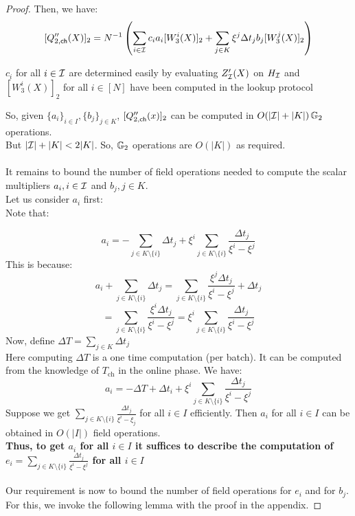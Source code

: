 \begin{proof}
    Then, we have:
    \begin{equation}\label{eq:Qcachepoly2commit}
    [Q''_{2,\mathsf{ch}}({X})]_2 = N^{-1}\left(\sum_{i\in\mathcal{I}}c_ia_i[W_3^i(X)]_2 + \sum_{j\in K}\xi^j \Delta t_j b_j [W_3^j(X)]_2\right)
    \end{equation}

    $c_i$ for all $i \in \mathcal{I}$ are determined easily by evaluating $Z_{\mathcal{I}}'(X)$ on $H_{\mathcal{I}}$ and $[W_3^i(X)]_2$ for all $i \in [N]$ have been computed in the lookup protocol

    So, given $\{a_i\}_{i\in I}, \{b_j\}_{j\in K}$, $[Q''_{2,\mathsf{ch}}({x})]_2$ can be computed in $O(|\mathcal{I}|+|K|)\, \mathbb{G}_2$ operations.\\
    But $|\mathcal{I}|+|K|<2|K|$. So, $\mathbb{G}_2$ operations are $O(|K|)$ as required.\\\\

    It remains to bound the number of field operations needed to compute the scalar multipliers $a_i, i \in \mathcal{I}$ and $b_j, j \in K$. \\

    Let us consider $a_i$ first:\\
    Note that:

    $$ a_i = -\sum_{j\in K\setminus \{i\}}\Delta t_j + \xi^i\sum_{j\in K\setminus \{i\}}\frac{\Delta t_j}{\xi^i-\xi^j} $$
    This is because:
    $$a_i+\sum_{j\in K\setminus \{i\}}\Delta t_j= \sum_{j \in K \setminus \{i\}}\frac{\xi^j\Delta t_j}{\xi^i-\xi^j}+\Delta t_j$$
    $$=\sum_{j \in K \setminus \{i\}}\frac{\xi^i\Delta t_j}{\xi^i-\xi^j} = \xi^i\sum_{j\in K\setminus \{i\}}\frac{\Delta t_j}{\xi^i-\xi^j}$$
    Now, define $\Delta T=\sum_{j\in K}\Delta t_j$\\

    Here computing $\Delta T$ is a one time computation (per batch). It can be computed from the knowledge of $T_{\text{ch}}$ in the online phase.
    We have:
    $$ a_i = -\Delta T + \Delta t_i + \xi^i\sum_{j\in K\setminus\{i\}}\frac{\Delta t_j}{\xi^i-\xi^j} $$
    Suppose we get $\sum_{j\in K\setminus\{i\}}\frac{\Delta t_j}{\xi^i-\xi_j}$ for all $i \in I$ efficiently. Then $a_i$ for all $i \in I$ can be obtained in $O(|I|)$ field operations. \\
    \textbf{Thus, to get $a_i$ for all $i \in I$ it suffices to describe the computation of $e_i=\sum_{j\in K\setminus\{i\}}\frac{\Delta t_j}{\xi^i-\xi^j}$ for all $i \in I$}\\\\
    Our requirement is now to bound the number of field operations for $e_i$ and for $b_j$. For this, we invoke the following lemma with the proof in the appendix.


\end{proof}
